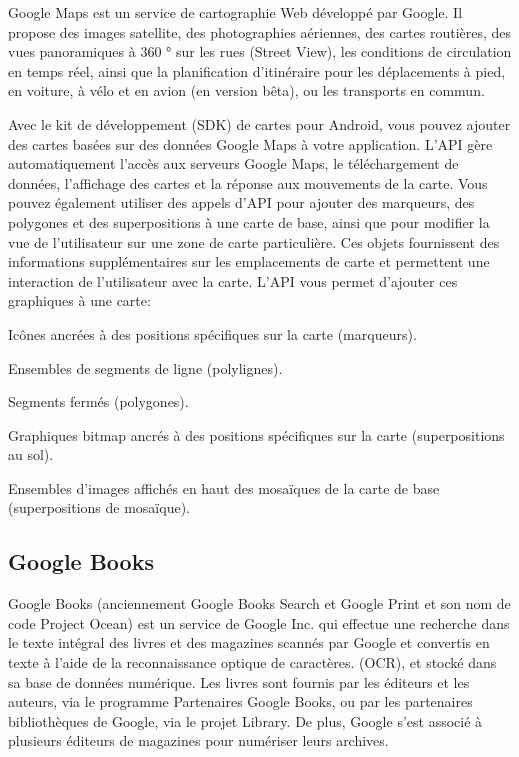 Google Maps est un service de cartographie Web développé par Google. Il propose des images satellite, des photographies aériennes, des cartes routières, des vues panoramiques à 360 ° sur les rues (Street View), les conditions de circulation en temps réel, ainsi que la planification d'itinéraire pour les déplacements à pied, en voiture, à vélo et en avion (en version bêta), ou les transports en commun.

Avec le kit de développement (SDK) de cartes pour Android, vous pouvez ajouter des cartes basées sur des données Google Maps à votre application. L'API gère automatiquement l'accès aux serveurs Google Maps, le téléchargement de données, l'affichage des cartes et la réponse aux mouvements de la carte. Vous pouvez également utiliser des appels d'API pour ajouter des marqueurs, des polygones et des superpositions à une carte de base, ainsi que pour modifier la vue de l'utilisateur sur une zone de carte particulière. Ces objets fournissent des informations supplémentaires sur les emplacements de carte et permettent une interaction de l'utilisateur avec la carte. L'API vous permet d'ajouter ces graphiques à une carte:

\begin{list}{•}{}
\item Icônes ancrées à des positions spécifiques sur la carte (marqueurs).
\item Ensembles de segments de ligne (polylignes).
\item Segments fermés (polygones).
\item Graphiques bitmap ancrés à des positions spécifiques sur la carte (superpositions au sol).
\item Ensembles d'images affichés en haut des mosaïques de la carte de base (superpositions de mosaïque).
\end{list}

\subsection{Google Books}
Google Books (anciennement Google Books Search et Google Print et son nom de code Project Ocean) est un service de Google Inc. qui effectue une recherche dans le texte intégral des livres et des magazines scannés par Google et convertis en texte à l'aide de la reconnaissance optique de caractères. (OCR), et stocké dans sa base de données numérique. Les livres sont fournis par les éditeurs et les auteurs, via le programme Partenaires Google Books, ou par les partenaires bibliothèques de Google, via le projet Library. De plus, Google s'est associé à plusieurs éditeurs de magazines pour numériser leurs archives.\cite{noauthor_google_nodate}

